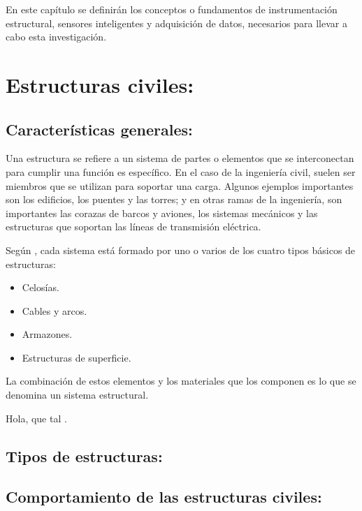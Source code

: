 
En este capítulo se definirán los conceptos  o fundamentos de instrumentación estructural, sensores inteligentes y adquisición de datos, necesarios para llevar a cabo esta investigación.

\section{Estructuras civiles:}

\subsection{Características generales:}

Una estructura se refiere a un sistema de partes o elementos que se interconectan para cumplir una función es específico. En el caso de la ingeniería civil, suelen ser miembros que se utilizan para soportar una carga. Algunos ejemplos importantes son los edificios, los puentes y las torres; y en otras ramas de la ingeniería, son importantes las corazas de barcos y aviones, los sistemas mecánicos y las estructuras que soportan las líneas de transmisión eléctrica.

Según \cite{hibbeler1997structural}, cada sistema está formado por uno o varios de los cuatro tipos básicos de estructuras: 

\begin{itemize}
    \item Celosías.
    \item Cables y arcos.
    \item Armazones.
    \item Estructuras de superficie.
\end{itemize}

La combinación de estos elementos y los materiales que los componen es lo que se denomina un sistema estructural.

Hola, que tal \cite{alderliesten2018introduction}.

\subsection{Tipos de estructuras:}

\subsection{Comportamiento de las estructuras civiles:}


